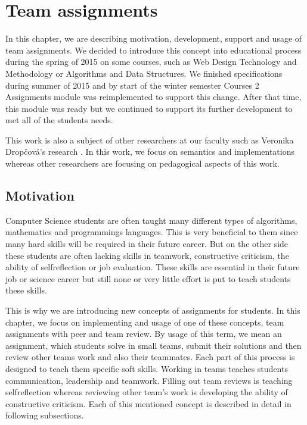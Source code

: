 \chapter{Team assignments}


\label{sec:teamprojects}
In this chapter, we are describing motivation, development, support and usage of team assignments. We decided to introduce this concept into educational process during the spring of 2015 on some courses, such as Web Design Technology and Methodology or Algorithms and Data Structures. We finished specifications during summer of 2015 and by start of the winter semester   Courses 2 Assignments module was reimplemented to support this change. After that time, this module was ready but we continued to support its further development to met all of the students needs.


This work is also a subject of other researchers at our faculty such as Veronika Drop\v{c}ov\'{a}'s research \cite{dropcova}. In this work, we focus on semantics and implementations whereas other researchers are focusing on pedagogical aspects of this work.


\section{Motivation}

Computer Science students are often taught many different types of algorithms, mathematics and programmings languages. This is very beneficial to them since many hard skills will be required in their future career. But on the other side  these students are often lacking skills in teamwork, constructive criticism, the ability of self\-reflection or job evaluation.  These skills are essential in their future job or science career but still none or very little effort is put to teach students these skills. 

This is why we are introducing new concepts of assignments for students.  In this chapter, we focus on implementing and usage of one of these concepts, team assignments with peer and team review. By usage of this term, we mean an assignment, which students solve in small teams, submit their solutions and then review other teams work and also their teammates. Each part of this process is designed to teach them specific soft skills. Working in teams teaches students communication, leadership and teamwork. Filling out team reviews is teaching self\-reflection whereas reviewing other team's work is developing the ability of constructive criticism. Each of this mentioned concept is described in detail in following subsections.

